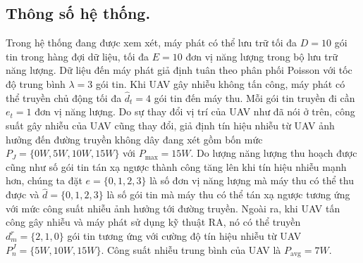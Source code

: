\documentclass{uetgraduation}
\begin{document}
\subsection{Thông số hệ thống.}
Trong hệ thống đang được xem xét, máy phát có thể lưu trữ tối đa $D = 10$ gói tin trong hàng đợi dữ liệu, tối đa $E = 10$ đơn vị năng lượng
trong bộ lưu trữ năng lượng. Dữ liệu đến máy phát giả định tuân theo phân phối Poisson với tốc độ trung bình $\lambda = 3$ 
gói tin. Khi UAV gây nhiễu không tấn công, máy phát có thể truyền chủ động tối đa $\hat{d}_t = 4$ gói tin đến máy thu. Mỗi gói tin truyền đi cần
$e_t = 1$ đơn vị năng lượng. Do sự thay đổi vị trí của UAV như đã nói ở trên, công suất gây nhiễu của UAV cũng thay đổi, giả định tín hiệu nhiễu từ 
UAV ảnh hưởng đến đường truyền không dây đang xét gồm bốn mức $P_J = \{0W, 5W, 10W, 15W\}$ với $P_{\text{max}} = 15W$. Do lượng năng lượng
thu hoạch được cũng như số gói tin tán xạ ngược thành công tăng lên khi tín hiệu nhiễu mạnh hơn, chúng ta đặt $e = \{0, 1, 2, 3\}$ là số đơn vị
năng lượng mà máy thu có thể thu được và $\hat{d} = \{0, 1, 2, 3\}$ là số gói tin mà máy thu có thể tán xạ ngược tương ứng với mức công suất nhiễu
ảnh hưởng tới đường truyền. Ngoài ra, khi UAV tấn công gây nhiễu và máy phát sử dụng kỹ thuật RA, nó có thể truyền $d^r_m = \{2, 1, 0\}$ gói tin
tương ứng với cường độ tín hiệu nhiễu từ UAV $P^J_n = \{5W, 10W, 15W\}$. Công suất nhiễu trung bình của UAV là $P_\text{avg} = 7W$.
\end{document}
